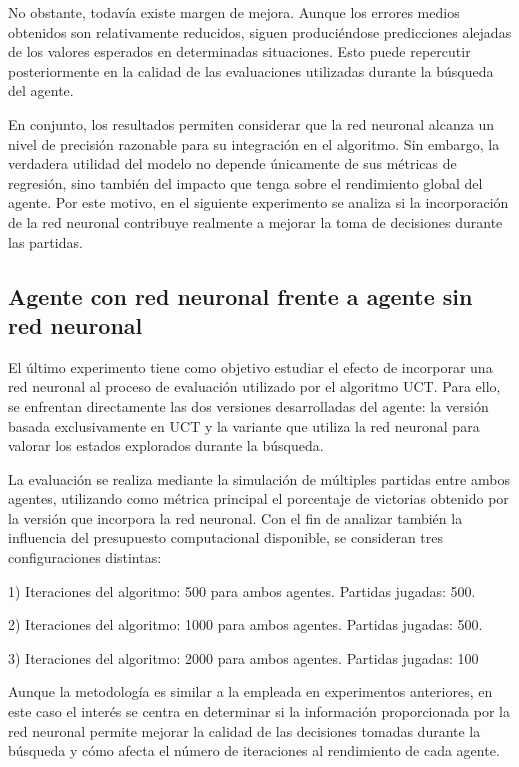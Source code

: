 \documentclass[conference,a4paper]{IEEEtran}
\begin{document}
No obstante, todavía existe margen de mejora. Aunque los errores medios obtenidos son relativamente reducidos, siguen produciéndose predicciones alejadas de los valores esperados en determinadas situaciones. 
Esto puede repercutir posteriormente en la calidad de las evaluaciones utilizadas durante la búsqueda del agente. 

En conjunto, los resultados permiten considerar que la red neuronal alcanza un nivel de precisión razonable para su integración en el algoritmo. 
Sin embargo, la verdadera utilidad del modelo no depende únicamente de sus métricas de regresión, sino también del impacto que tenga sobre el rendimiento global del agente. 
Por este motivo, en el siguiente experimento se analiza si la incorporación de la red neuronal contribuye realmente a mejorar la toma de decisiones durante las partidas. 

\subsection{Agente con red neuronal frente a agente sin red neuronal} 
El último experimento tiene como objetivo estudiar el efecto de incorporar una red neuronal al proceso de evaluación utilizado por el algoritmo UCT. 
Para ello, se enfrentan directamente las dos versiones desarrolladas del agente: la versión basada exclusivamente en UCT y la variante que utiliza la red neuronal para valorar los estados explorados durante la búsqueda. 

La evaluación se realiza mediante la simulación de múltiples partidas entre ambos agentes, utilizando como métrica principal el porcentaje de victorias obtenido por la versión que incorpora la red neuronal. 
Con el fin de analizar también la influencia del presupuesto computacional disponible, se consideran tres configuraciones distintas: 

1) Iteraciones del algoritmo: 500 para ambos agentes. Partidas jugadas: 500. 

2) Iteraciones del algoritmo: 1000 para ambos agentes. Partidas jugadas: 500. 

3) Iteraciones del algoritmo: 2000 para ambos agentes. Partidas jugadas: 100 

Aunque la metodología es similar a la empleada en experimentos anteriores, en este caso el interés se centra en determinar si la información proporcionada por la red neuronal permite mejorar la calidad de las decisiones tomadas durante la búsqueda y cómo afecta el número de iteraciones al rendimiento de cada agente. 
\end{document}
